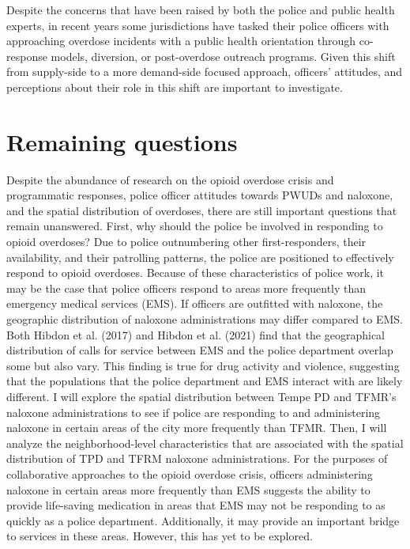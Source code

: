 Despite the concerns that have been raised by both the police and public health experts, in recent years some jurisdictions have tasked their police officers with approaching overdose incidents with a public health orientation through co-response models, diversion, or post-overdose outreach programs. Given this shift from supply-side to a more demand-side focused approach, officers’ attitudes, and perceptions about their role in this shift are important to investigate.

\section{Remaining questions}
	
Despite the abundance of research on the opioid overdose crisis and programmatic responses, police officer attitudes towards PWUDs and naloxone, and the spatial distribution of overdoses, there are still important questions that remain unanswered. First, why should the police be involved in responding to opioid overdoses? Due to police outnumbering other first-responders, their availability, and their patrolling patterns, the police are positioned to effectively respond to opioid overdoses. Because of these characteristics of police work, it may be the case that police officers respond to areas more frequently than emergency medical services (EMS). If officers are outfitted with naloxone, the geographic distribution of naloxone administrations may differ compared to EMS. Both Hibdon et al. (2017) and Hibdon et al. (2021) find that the geographical distribution of calls for service between EMS and the police department overlap some but also vary. This finding is true for drug activity and violence, suggesting that the populations that the police department and EMS interact with are likely different. I will explore the spatial distribution between Tempe PD and TFMR’s naloxone administrations to see if police are responding to and administering naloxone in certain areas of the city more frequently than TFMR. Then, I will analyze the neighborhood-level characteristics that are associated with the spatial distribution of TPD and TFRM naloxone administrations. For the purposes of collaborative approaches to the opioid overdose crisis, officers administering naloxone in certain areas more frequently than EMS suggests the ability to provide life-saving medication in areas that EMS may not be responding to as quickly as a police department. Additionally, it may provide an important bridge to services in these areas. However, this has yet to be explored.

